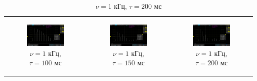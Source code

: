 \documentclass[a4paper,12pt]{article} %
\begin{document}
\begin{table}[ht]
\begin{tabular}{ccc}
\begin{subfigure}{0.3\textwidth}\centering\includegraphics[width=\columnwidth]{I/AKIP0006.png}\caption{$\nu = 1$ кГц, $\tau = 100$ мс}\end{subfigure} &
\begin{subfigure}{0.3\textwidth}\centering\includegraphics[width=\columnwidth]{I/AKIP0007.png}\caption{$\nu = 1$ кГц, $\tau = 150$ мс}\end{subfigure} &
\begin{subfigure}{0.3\textwidth}\centering\includegraphics[width=\columnwidth]{I/AKIP0008.png}\caption{$\nu = 1$ кГц, $\tau = 200$ мс}\end{subfigure} \\

\end{tabular}
\end{table}
\end{document}
